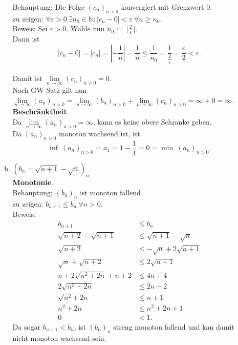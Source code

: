 \documentclass[12pt,a4paper]{article}
\begin{document}
\begin{enumerate}[(i)]
\begin{enumerate}[(a)]
        Behauptung: Die Folge $(c_n)_{n>0}$ konvergiert mit Grenzwert $0$.\\
        zu zeigen: $\forall \varepsilon > 0\ \exists n_0 \in \mathbb{N}: |c_n - 0| < \varepsilon\ \forall n \geq n_0$.\\
        Beweis:
        Sei $\varepsilon > 0$.
        Wähle nun $n_0 := \lceil\frac{2}{\varepsilon}\rceil$.\\
        Dann ist $$|c_n - 0| = |c_n| = |-\frac{1}{n}| = \frac{1}{n} \leq \frac{1}{n_0} = \frac{1}{\frac{2}{\varepsilon}} = \frac{\varepsilon}{2} < \varepsilon.$$\\
        Damit ist $\lim\limits_{n \to \infty}(c_n)_{n>0} = 0$.\\

        Nach GW-Satz gilt nun $\lim\limits_{n \to \infty}(a_n)_{n>0} = \lim\limits_{n \to \infty}(b_n)_{n>0} + \lim\limits_{n \to \infty}(c_n)_{n>0} = \infty + 0 = \infty$.\\

        \textbf{Beschränktheit}.\\
        Da $\lim\limits_{n \to \infty}(a_n)_{n>0} = \infty$, kann es keine obere Schranke geben.\\
        Da $(a_n)_{n>0}$ monoton wachsend ist, ist $$\inf\ (a_n)_{n>0} = a_1 = 1 - \frac{1}{1} = 0 = \min\ (a_n)_{n>0}.$$


        \item $(b_n = \sqrt{n+1} - \sqrt{n})_n$\\

        \textbf{Monotonie}.\\
        Behauptung: $(b_n)_n$ ist monoton fallend.\\
        zu zeigen: $b_{n+1} \leq b_n\ \forall n > 0$.\\
        Beweis:\begin{align*}
            b_{n+1} &\leq b_n\\
            \sqrt{n+2} - \sqrt{n+1} &\leq \sqrt{n+1} - \sqrt{n}\\
            \sqrt{n+2} &\leq -\sqrt{n} + 2\sqrt{n+1}\\
            \sqrt{n} + \sqrt{n+2} &\leq 2\sqrt{n+1}\\
            n + 2\sqrt{n^2+2n} + n + 2 &\leq 4n + 4\\
            2\sqrt{n^2+2n} &\leq 2n + 2\\
            \sqrt{n^2+2n} &\leq n + 1\\
            n^2 + 2n &\leq n^2 + 2n + 1\\
            0 &< 1.
        \end{align*}
        Da sogar $b_{n+1} < b_n$, ist $(b_n)_n$ streng monoton fallend und kan damit nicht monoton wachsend sein.\\


\end{enumerate}
\end{enumerate}
\end{document}
